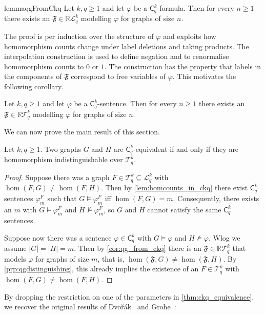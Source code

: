 \documentclass[a4paper,UKenglish,cleveref, autoref, thm-restate]{lipics-v2021}
\renewcommand{\phi}{\varphi}
\newcommand{\R}{\ensuremath{\mathbb{R}}}
\newcommand{\Ekq}{\ensuremath{\mathcal{T}_{q}^{k}}}
\newcommand{\Lkq}{\ensuremath{\mathcal{L}_{q}^{k}}}
\newcommand{\lC} {\ensuremath{\mathsf C}}
\newcommand{\qg}[1]{\ensuremath{\mathfrak{#1}}} \newcommand{\qgp}[3]{\ensuremath{\mathfrak{#1}[#3; #2]}}
\begin{document}
  \begin{restatable}{lemma}{qgFromCkq}
    \label{lem:qg_from_ckq}
  Let $k, q \geq 1$ and let $\phi$ be a $\lC^k_q$-formula. Then for every $n \geq 1$ there exists an $\qg{F} \in \R\Lkq$ modelling $\phi$ for graphs of size $n$.
\end{restatable}

The proof is per induction over the structure of $\phi$ and exploits how homomorphism counts change under label deletions and taking products. The interpolation construction is used to define negation and to renormalise homomorphism counts to $0$ or $1$. The construction has the property that labels in the components of $\qg{F}$ correspond to free variables of $\phi$. This motivates the following corollary.

\begin{corollary}\label{cor:qg_from_ckq}
  Let $k, q \geq 1$ and let $\phi$ be a $\lC^k_q$-sentence. Then for every $n \geq 1$ there exists an $\qg{F} \in \R\Ekq$ modelling $\phi$ for graphs of size $n$.
\end{corollary}


  We can now prove the main result of this section.


  \begin{theorem}\label{thm:ckq_equivalence}
    Let $k,q \geq 1$. 
    Two graphs $G$ and $H$ are $\lC^k_q$-equivalent if and only if they are homomorphism indistinguishable over $\Ekq$.
  \end{theorem}
  \begin{proof}
    Suppose there was a graph $F \in \Ekq \subseteq \Lkq$ with $\hom(F, G) \neq \hom(F, H)$. Then by \cref{lem:homcounts_in_ckq} there exist $\lC^k_q$ sentences $\varphi^F_m$ such that $G \models \varphi^F_m$ iff $\hom(F, G) = m$. Consequently, there exists an $m$ with $G \models \varphi^F_m$ and $H \not\models \varphi^F_m$, so $G$ and $H$ cannot satisfy the same $\lC^k_q$ sentences.

    Suppose now there was a sentence $\phi \in \lC^k_q$ with $G \models \phi$ and $H \not\models \phi$. Wlog we assume $|G| = |H| = m$. Then by \cref{cor:qg_from_ckq} there is an $\qg{F} \in \R\Ekq$ that models $\phi$ for graphs of size $m$, that is, $\hom(\qg{F}, G) \neq \hom(\qg{F}, H)$. By \cref{prp:qgdistinguishing}, this already implies the existence of an $F \in \Ekq$ with $\hom(F, G) \neq \hom(F, H)$.
  \end{proof}

  By dropping the restriction on one of the parameters in \cref{thm:ckq_equivalence}, we recover the original results of Dvo\v{r}\'ak~\cite{dvorak_recognizing_2010} and Grohe~\cite{grohe_counting_2020}:
\end{document}
